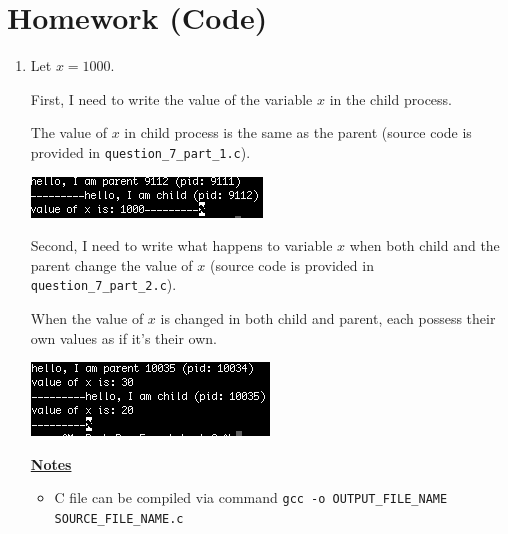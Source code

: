 \documentclass[12pt]{article}
\begin{document}
\section{Homework (Code)}

\begin{enumerate}[1.]
    \item

    Let $x = 1000$.

    \bigskip

    First, I need to write the value of the variable $x$ in the child process.

    \bigskip

    The value of $x$ in child process is the same as the parent (source code is provided in \texttt{question\_7\_part\_1.c}).

    \bigskip

    \begin{center}
    \includegraphics[width=0.5\linewidth]{images/worksheet_2_solution_14.png}
    \end{center}

    \bigskip

    Second, I need to write what happens to variable $x$ when both child and the
    parent change the value of $x$ (source code is provided in \texttt{question\_7\_part\_2.c}).

    \bigskip

    When the value of $x$ is changed in both child and parent, each possess their own values
    as if it's their own.

    \bigskip

    \begin{center}
    \includegraphics[width=0.5\linewidth]{images/worksheet_2_solution_15.png}
    \end{center}


    \bigskip

    \underline{\textbf{Notes}}

    \begin{itemize}
        \item C file can be compiled via command \texttt{gcc -o OUTPUT\_FILE\_NAME SOURCE\_FILE\_NAME.c}
    \end{itemize}


\end{enumerate}
\end{document}
